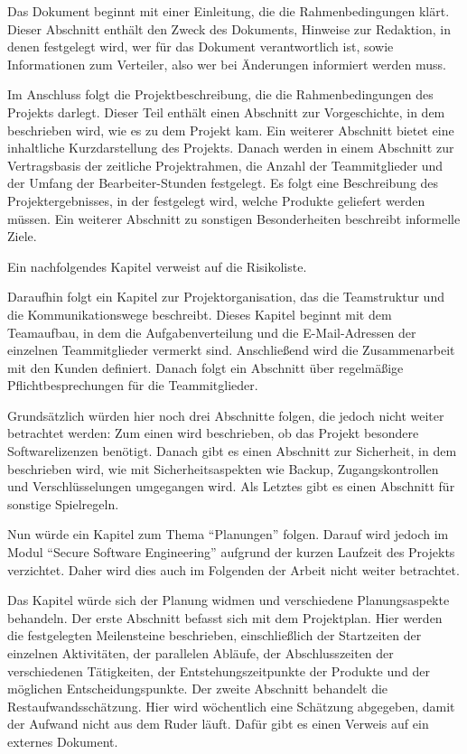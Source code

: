 Das Dokument beginnt mit einer Einleitung, die die Rahmenbedingungen klärt. Dieser Abschnitt enthält den Zweck des 
Dokuments, Hinweise zur Redaktion, in denen festgelegt wird, wer für das Dokument verantwortlich ist, sowie 
Informationen zum Verteiler, also wer bei Änderungen informiert werden muss.

Im Anschluss folgt die Projektbeschreibung, die die Rahmenbedingungen des Projekts darlegt. Dieser Teil enthält einen 
Abschnitt zur Vorgeschichte, in dem beschrieben wird, wie es zu dem Projekt kam. Ein weiterer Abschnitt bietet eine 
inhaltliche Kurzdarstellung des Projekts. Danach werden in einem Abschnitt zur Vertragsbasis der zeitliche 
Projektrahmen, die Anzahl der Teammitglieder und der Umfang der Bearbeiter-Stunden festgelegt. Es folgt eine 
Beschreibung des Projektergebnisses, in der festgelegt wird, welche Produkte geliefert werden müssen. Ein weiterer 
Abschnitt zu sonstigen Besonderheiten beschreibt informelle Ziele.

Ein nachfolgendes Kapitel verweist auf die Risikoliste.

Daraufhin folgt ein Kapitel zur Projektorganisation, das die Teamstruktur und die Kommunikationswege beschreibt. 
Dieses Kapitel beginnt mit dem Teamaufbau, in dem die Aufgabenverteilung und die E-Mail-Adressen der einzelnen 
Teammitglieder vermerkt sind. Anschließend wird die Zusammenarbeit mit den Kunden definiert. Danach folgt ein 
Abschnitt über regelmäßige Pflichtbesprechungen für die Teammitglieder.

Grundsätzlich würden hier noch drei Abschnitte folgen, die jedoch nicht weiter betrachtet werden: Zum einen 
wird beschrieben, ob das Projekt besondere Softwarelizenzen benötigt. Danach gibt es einen Abschnitt zur 
Sicherheit, in dem beschrieben wird, wie mit Sicherheitsaspekten wie Backup, Zugangskontrollen und 
Verschlüsselungen umgegangen wird. Als Letztes gibt es einen Abschnitt für sonstige Spielregeln.

Nun würde ein Kapitel zum Thema ``Planungen'' folgen. Darauf wird jedoch im Modul ``Secure Software Engineering'' 
aufgrund der kurzen Laufzeit des Projekts verzichtet. Daher wird dies auch im Folgenden der Arbeit nicht weiter 
betrachtet.

Das Kapitel würde sich der Planung widmen und verschiedene Planungsaspekte behandeln. Der erste Abschnitt 
befasst sich mit dem Projektplan. Hier werden die festgelegten Meilensteine beschrieben, einschließlich der 
Startzeiten der einzelnen Aktivitäten, der parallelen Abläufe, der Abschlusszeiten der verschiedenen 
Tätigkeiten, der Entstehungszeitpunkte der Produkte und der möglichen Entscheidungspunkte. Der zweite 
Abschnitt behandelt die Restaufwandsschätzung. Hier wird wöchentlich eine Schätzung abgegeben, damit der 
Aufwand nicht aus dem Ruder läuft. Dafür gibt es einen Verweis auf ein externes Dokument.


